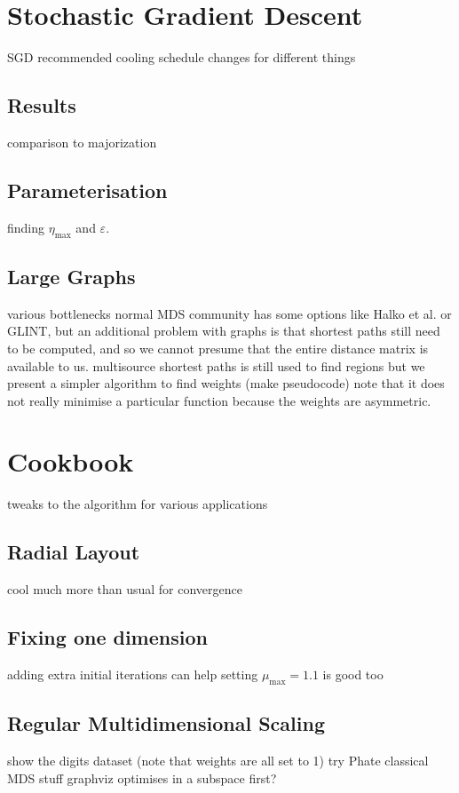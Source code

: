 \section{Stochastic Gradient Descent}
SGD
recommended cooling schedule changes for different things
\subsection{Results}
comparison to majorization
\subsection{Parameterisation}
finding $\eta_{\max}$ and $\varepsilon$.
\subsection{Large Graphs}
various bottlenecks
normal MDS community has some options like Halko et al. or GLINT, but an additional problem with graphs is that shortest paths still need to be computed, and so we cannot presume that the entire distance matrix is available to us.
multisource shortest paths is still used to find regions
but we present a simpler algorithm to find weights (make pseudocode)
note that it does not really minimise a particular function because the weights are asymmetric.

\section{Cookbook}
tweaks to the algorithm for various applications
\subsection{Radial Layout}
cool much more than usual for convergence
\subsection{Fixing one dimension}
adding extra initial iterations can help
setting $\mu_{\max}=1.1$ is good too
\subsection{Regular Multidimensional Scaling}
show the digits dataset (note that weights are all set to 1)
try Phate classical MDS stuff
graphviz optimises in a subspace first?